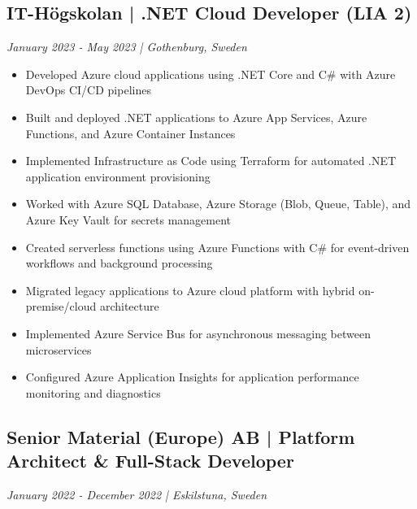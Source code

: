 \documentclass[11pt,a4paper]{article}
\begin{document}
\subsection*{IT-Högskolan | .NET Cloud Developer (LIA 2)}
\textit{January 2023 - May 2023 | Gothenburg, Sweden}

\begin{itemize}[leftmargin=*, itemsep=2pt]
\item Developed Azure cloud applications using .NET Core and C\# with Azure DevOps CI/CD pipelines
\item Built and deployed .NET applications to Azure App Services, Azure Functions, and Azure Container Instances
\item Implemented Infrastructure as Code using Terraform for automated .NET application environment provisioning
\item Worked with Azure SQL Database, Azure Storage (Blob, Queue, Table), and Azure Key Vault for secrets management
\item Created serverless functions using Azure Functions with C\# for event-driven workflows and background processing
\item Migrated legacy applications to Azure cloud platform with hybrid on-premise/cloud architecture
\item Implemented Azure Service Bus for asynchronous messaging between microservices
\item Configured Azure Application Insights for application performance monitoring and diagnostics
\end{itemize}

\subsection*{Senior Material (Europe) AB | Platform Architect \& Full-Stack Developer}
\textit{January 2022 - December 2022 | Eskilstuna, Sweden}
\end{document}
